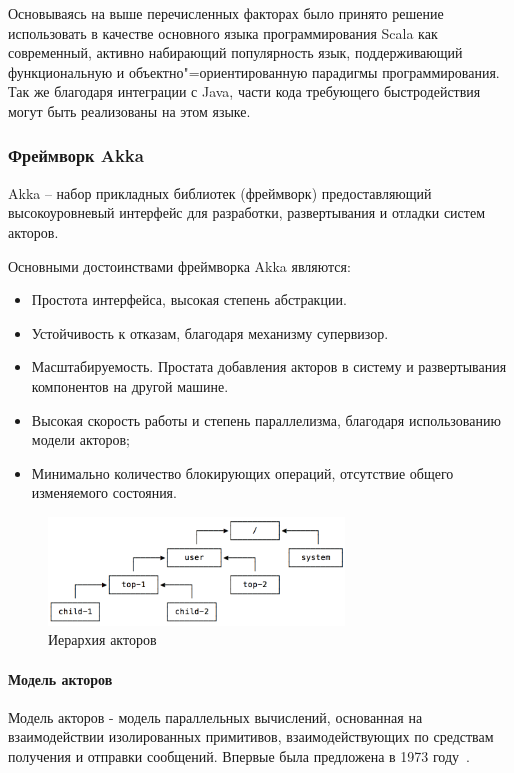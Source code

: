 Основываясь на выше перечисленных факторах было принято решение использовать в качестве основного языка программирования Scala как современный, активно набирающий популярность язык, поддерживающий функциональную и объектно"=ориентированную парадигмы программирования. Так же благодаря интеграции с Java, части кода требующего быстродействия могут быть реализованы на этом языке.

\subsubsection{Фреймворк Akka}
\label{sec:techs:akka}

Akka – набор прикладных библиотек (фреймворк) предоставляющий высокоуровневый интерфейс для разработки, развертывания и отладки систем акторов.

Основными достоинствами фреймворка Akka являются:
\begin{itemize}
  \item Простота интерфейса, высокая степень абстракции.
  \item Устойчивость к отказам, благодаря механизму супервизор.
  \item Масштабируемость. Простата добавления акторов в систему и развертывания компонентов на другой машине.
  \item Высокая скорость работы и степень параллелизма, благодаря использованию модели акторов;
  \item Минимально количество блокирующих операций, отсутствие общего изменяемого состояния.
\end{itemize}

\begin{figure}[ht]
    \centering
    \includegraphics[width=0.7\textwidth]{figures/actors_hier.png}
    \caption{Иерархия акторов}
    \label{fig:techs:akka:actor_hierar}
\end{figure}

\paragraph{Модель акторов}
\label{sec:techs:akka:actor_model}
Модель акторов - модель параллельных вычислений, основанная на взаимодействии изолированных примитивов, взаимодействующих по средствам получения и отправки сообщений. Впервые была предложена в 1973 году~\cite{hewitt_bishop_steiger_actor_model}.


